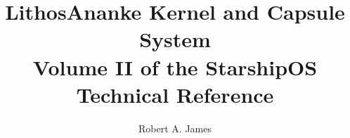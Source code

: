 


\title{LithosAnanke Kernel and Capsule System\\[0.5em]
       \large Volume II of the StarshipOS Technical Reference}
\author{Robert A. James}
\date{%
}


\maketitle
\tableofcontents












